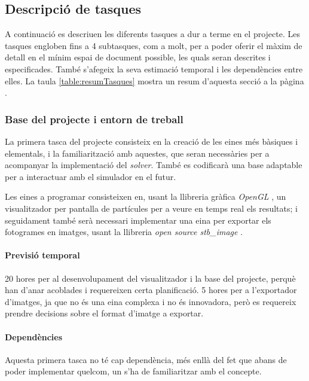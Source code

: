 \documentclass[a4paper]{article} %
\begin{document}
	\subsection{Descripció de tasques}
	A continuació es descriuen les diferents tasques a dur a terme en el projecte. Les tasques engloben fins a 4 subtasques, com a molt, per a poder oferir el màxim de detall en el mínim espai de document possible, les quals seran descrites i especificades. També s'afegeix la seva estimació temporal i les dependències entre elles. La taula \ref{table:resumTasques} mostra un resum d'aquesta secció a la pàgina \pageref{table:resumTasques}.
	\subsubsection{Base del projecte i entorn de treball}
	La primera tasca del projecte consisteix en la creació de les eines més bàsiques i elementals, i la familiarització amb aquestes, que seran necessàries per a acompanyar la implementació del \textit{solver}. També es codificarà una base adaptable per a interactuar amb el simulador en el futur.\par 
	
	Les eines a programar consisteixen en, usant la llibreria gràfica \textit{OpenGL} \cite{SiliconGraphics2013}, un visualitzador per pantalla de partícules per a veure en temps real els resultats; i seguidament també serà necessari implementar una eina per exportar els fotogrames en imatges, usant la llibreria \textit{open source stb\_image} \cite{stb}. 

	\paragraph{\quad Previsió temporal} 20 hores per al desenvolupament del visualitzador i la base del projecte, perquè han d'anar acoblades i requereixen certa planificació. 5 hores per a l'exportador d'imatges, ja que no és una eina complexa i no és innovadora, però es requereix prendre decisions sobre el format d'imatge a exportar.
	\paragraph{\quad Dependències} Aquesta primera tasca no té cap dependència, més enllà del fet que abans de poder implementar quelcom, un s'ha de familiaritzar amb el concepte.
\end{document}
